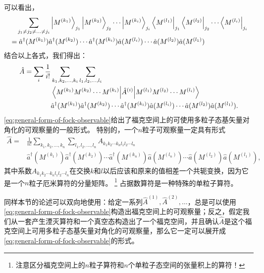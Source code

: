 \documentclass[hyperref, UTF8, a4paper]{ctexart}
\begin{document}
可以看出，
\[
    \begin{aligned}
        &\quad \sum_{j_1 \neq j_2 \neq \ldots \neq j_i} \ket{M^{(k_1)}}_{j_1} \ket{M^{(k_2)}}_{j_2} \cdots \ket{M^{(k_i)}}_{j_i} 
        \bra{M^{(l_1)}}_{j_1} \bra{M^{(l_2)}}_{j_2} \cdots \bra{M^{(l_i)}}_{j_i} \\
        &= \hat{a}^\dagger (M^{(k_1)}) \hat{a}^\dagger (M^{(k_2)}) \cdots \hat{a}^\dagger (M^{(k_i)}) \hat{a} (M^{(l_i)}) \cdots \hat{a} (M^{(l_2)}) \hat{a} (M^{(l_1)})  
    \end{aligned}
\]
结合以上各式，我们得出：
\begin{equation}
    \begin{aligned}
        \hat{A} = \sum_i \frac{1}{i!} &\sum_{k_1, k_2, \ldots, k_i} \sum_{l_1, l_2, \ldots, l_i} \\
        &\mel{M^{(k_1)} M^{(k_2)} \cdots M^{(k_i)}}{\hat{A}^{(i)}}{M^{(l_1)} M^{(l_2)} \cdots M^{(l_i)}} \\
        &\hat{a}^\dagger (M^{(k_1)}) \hat{a}^\dagger (M^{(k_2)}) \cdots \hat{a}^\dagger (M^{(k_i)}) \hat{a} (M^{(l_i)}) \cdots \hat{a} (M^{(l_2)}) \hat{a} (M^{(l_1)}).
        \label{eq:general-form-of-fock-observable}
    \end{aligned}
\end{equation}
\eqref{eq:general-form-of-fock-observable}给出了福克空间上的可使用多粒子态基矢量对角化的可观察量的一般形式。
特别的，一个$n$粒子可观察量一定具有形式
\begin{equation}
    \begin{aligned}
        \hat{A} = &\frac{1}{n!} \sum_{k_1, k_2, \ldots, k_n} \sum_{l_1, l_2, \ldots, l_n} A_{k_1 k_2 \cdots k_n l_1 l_2 \cdots l_n} \\
        &\hat{a}^\dagger (M^{(k_1)}) \hat{a}^\dagger (M^{(k_2)}) \cdots \hat{a}^\dagger (M^{(k_n)}) \hat{a} (M^{(l_n)}) \cdots \hat{a} (M^{(l_2)}) \hat{a} (M^{(l_1)}),
    \end{aligned}
    \label{eq:n-particles-observable}
\end{equation}
其中系数$A_{k_1 k_2 \cdots k_n l_1 l_2 \cdots l_n}$在交换$k$和$l$以后应该和原来的值相差一个共轭变换，因为它是一个$n$粒子厄米算符的分量矩阵。%
\footnote{注意区分福克空间上的$n$粒子算符和$n$个单粒子态空间的张量积上的算符！}%
占据数算符是一种特殊的单粒子算符。

同样本节的论述可以双向地使用：给定一系列$\hat{A}^{(1)}, \hat{A}^{(2)}, \ldots$，总是可以使用\eqref{eq:general-form-of-fock-observable}构造出福克空间上的可观察量；反之，假定我们从一套产生湮灭算符和一个真空态构造出了一个福克空间，并且确认$\hat{A}$是这个福克空间上可用多粒子态基矢量对角化的可观察量，那么它一定可以展开成\eqref{eq:general-form-of-fock-observable}的形式。
\end{document}
